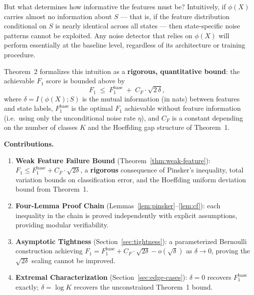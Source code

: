 \documentclass[12pt,a4paper]{article}
\begin{document}
But what determines how informative the features must be?  Intuitively, if
$\phi(X)$ carries almost no information about $S$ --- that is, if the feature
distribution conditional on $S$ is nearly identical across all states --- then
state-specific noise patterns cannot be exploited.  Any noise detector that
relies on $\phi(X)$ will perform essentially at the baseline level, regardless
of its architecture or training procedure.

Theorem~2 formalizes this intuition as a \textbf{rigorous, quantitative bound}:
the achievable $F_1$ score is bounded above by
\begin{equation}\label{eq:main-bound-intro}
    F_1 \;\leq\; F_1^{\mathrm{base}} \;+\; C_F \cdot \sqrt{2\,\delta},
\end{equation}
where $\delta = I(\phi(X); S)$ is the mutual information (in nats) between
features and state labels, $F_1^{\mathrm{base}}$ is the optimal $F_1$
achievable without feature information (i.e.\ using only the unconditional
noise rate $\eta$), and $C_F$ is a constant depending on the number of classes
$K$ and the Hoeffding gap structure of Theorem~1.

\medskip\noindent
\textbf{Contributions.}
\begin{enumerate}[label=(\arabic*)]
    \item \textbf{Weak Feature Failure Bound} (Theorem~\ref{thm:weak-feature}):
          $F_1 \leq F_1^{\mathrm{base}} + C_F\cdot\sqrt{2\delta}$, a
          \textbf{rigorous} consequence of Pinsker's inequality, total variation
          bounds on classification error, and the Hoeffding uniform deviation
          bound from Theorem~1.
    \item \textbf{Four-Lemma Proof Chain} (Lemmas~\ref{lem:pinsker}--\ref{lem:cf}):
          each inequality in the chain is proved independently with explicit
          assumptions, providing modular verifiability.
    \item \textbf{Asymptotic Tightness} (Section~\ref{sec:tightness}):
          a parameterized Bernoulli construction achieving
          $F_1 = F_1^{\mathrm{base}} + C_F\cdot\sqrt{2\delta} - o(\sqrt{\delta})$
          as $\delta\to 0$, proving the $\sqrt{2\delta}$ scaling cannot be improved.
    \item \textbf{Extremal Characterization} (Section~\ref{sec:edge-cases}):
          $\delta=0$ recovers $F_1^{\mathrm{base}}$ exactly; $\delta=\log K$
          recovers the unconstrained Theorem~1 bound.
\end{enumerate}
\end{document}
